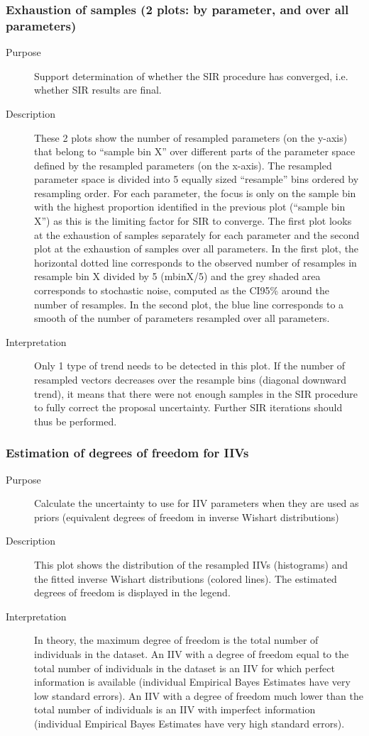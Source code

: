 \subsubsection{Exhaustion of samples (2 plots: by parameter, and over all parameters)}
\begin{description}
\item[Purpose] Support determination of whether the SIR procedure has converged, i.e. whether SIR results are final.
\item[Description] These 2 plots show the number of resampled parameters (on the y-axis) that belong to “sample bin X” over different parts of the parameter space defined by the resampled parameters (on the x-axis). The resampled parameter space is divided into 5 equally sized “resample” bins ordered by resampling order. For each parameter, the focus is only on the sample bin with the highest proportion identified in the previous plot (“sample bin X”) as this is the limiting factor for SIR to converge. The first plot looks at the exhaustion of samples separately for each parameter and the second plot at the exhaustion of samples over all parameters. In the first plot, the horizontal dotted line corresponds to the observed number of resamples in resample bin X divided by 5 (mbinX/5) and the grey shaded area corresponds to stochastic noise, computed as the CI95\% around the number of resamples. In the second plot, the blue line corresponds to a smooth of the number of parameters resampled over all parameters.
\item[Interpretation] Only 1 type of trend needs to be detected in this plot. If the number of resampled vectors decreases over the resample bins (diagonal downward trend), it means that there were not enough samples in the SIR procedure to fully correct the proposal uncertainty. Further SIR iterations should thus be performed.
\end{description}

\subsubsection{Estimation of degrees of freedom for IIVs }
\begin{description}
\item[Purpose] Calculate the uncertainty to use for IIV parameters when they are used as priors (equivalent degrees of freedom in
inverse Wishart distributions) 
\item[Description] This plot shows the distribution of the resampled IIVs (histograms) and the fitted inverse Wishart distributions (colored lines).
The estimated degrees of freedom is displayed in the legend.
\item[Interpretation] In theory, the maximum degree of freedom is the total number of individuals in the dataset. An IIV with a degree of freedom
equal to the total number of individuals in the dataset is an IIV for which perfect information is available (individual Empirical Bayes Estimates
have very low standard errors). An IIV with a degree of freedom much lower than the total number of individuals is an IIV with imperfect
information (individual Empirical Bayes Estimates have very high standard errors).
\end{description}

